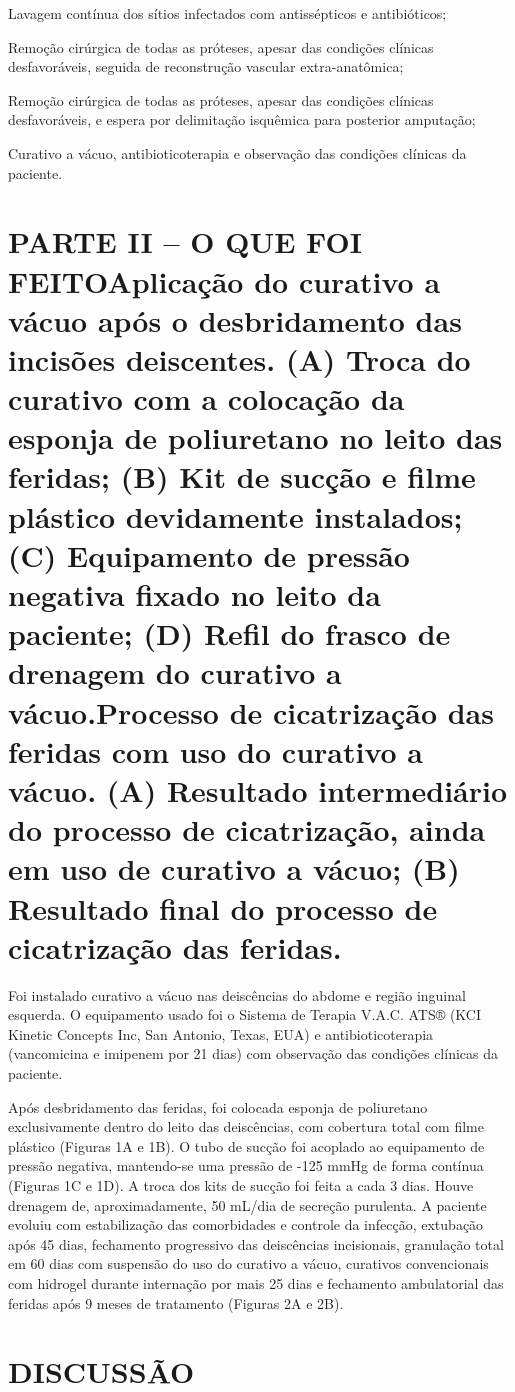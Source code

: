 \documentclass[numberinsection,times,10pt,spreadimages]{memoir}
\begin{document}
Lavagem contínua dos sítios infectados com antissépticos e antibióticos;

Remoção cirúrgica de todas as próteses, apesar das condições clínicas
desfavoráveis, seguida de reconstrução vascular extra-anatômica;

Remoção cirúrgica de todas as próteses, apesar das condições clínicas
desfavoráveis, e espera por delimitação isquêmica para posterior
amputação;

Curativo a vácuo, antibioticoterapia e observação das condições clínicas da
paciente.

\section{PARTE II – O QUE FOI FEITOAplicação do curativo a vácuo após o
desbridamento das incisões
deiscentes. (A) Troca do curativo com a colocação da esponja de poliuretano
no leito das feridas; (B) Kit de sucção e filme plástico devidamente
instalados; (C) Equipamento de pressão negativa fixado no leito da paciente;
(D) Refil do frasco de drenagem do curativo a vácuo.Processo de cicatrização das
feridas com uso do curativo a vácuo. (A)
Resultado intermediário do processo de cicatrização, ainda em uso de
curativo a vácuo; (B) Resultado final do processo de cicatrização das
feridas.}

Foi instalado curativo a vácuo nas deiscências do abdome e região inguinal
esquerda.
O equipamento usado foi o Sistema de Terapia V.A.C. ATS® (KCI Kinetic Concepts
Inc,
San Antonio, Texas, EUA) e antibioticoterapia (vancomicina e imipenem por 21
dias)
com observação das condições clínicas da paciente.

Após desbridamento das feridas, foi colocada esponja de poliuretano
exclusivamente
dentro do leito das deiscências, com cobertura total com filme plástico (Figuras
1A e 1B). O tubo de sucção foi acoplado ao equipamento de pressão negativa,
mantendo-se uma pressão de -125 mmHg de forma contínua (Figuras 1C e 1D). A
troca dos kits de sucção foi feita a cada 3 dias. Houve drenagem de,
aproximadamente, 50 mL/dia de secreção purulenta. A paciente evoluiu com
estabilização das comorbidades e controle da infecção, extubação após 45 dias,
fechamento progressivo das deiscências incisionais, granulação total em 60 dias
com
suspensão do uso do curativo a vácuo, curativos convencionais com hidrogel
durante
internação por mais 25 dias e fechamento ambulatorial das feridas após 9 meses
de
tratamento (Figuras 2A e 2B).

\section{DISCUSSÃO}
\end{document}

